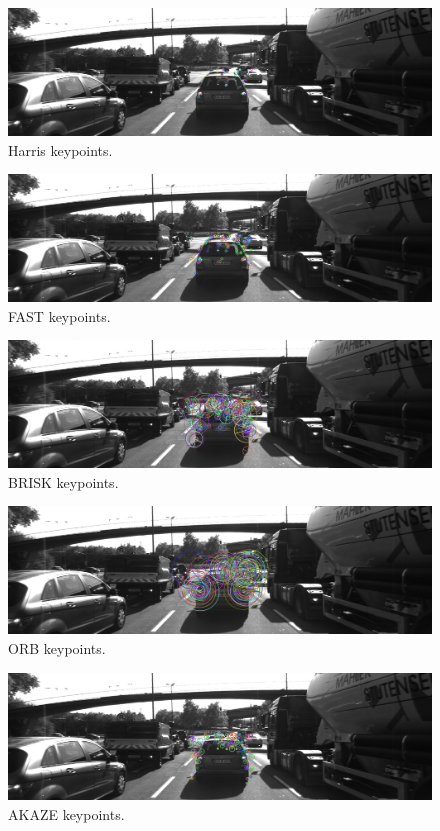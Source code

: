 \documentclass[a4paper]{scrartcl}
\begin{document}
\begin{figure}
	\centering
	\includegraphics[width=0.8\columnwidth]{./keypoints/HARRIS}
	\caption{Harris keypoints.}
\end{figure}

\begin{figure}
	\centering
	\includegraphics[width=0.8\columnwidth]{./keypoints/FAST}
	\caption{FAST keypoints.}
\end{figure}

\begin{figure}
	\centering
	\includegraphics[width=0.8\columnwidth]{./keypoints/BRISK}
	\caption{BRISK keypoints.}
\end{figure}

\begin{figure}
	\centering
	\includegraphics[width=0.8\columnwidth]{./keypoints/ORB}
	\caption{ORB keypoints.}
\end{figure}

\begin{figure}
	\centering
	\includegraphics[width=0.8\columnwidth]{./keypoints/AKAZE}
	\caption{AKAZE keypoints.}
\end{figure}
\end{document}
